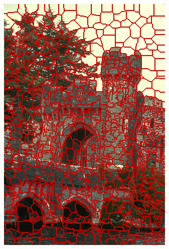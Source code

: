 \begin{figure}
{		\includegraphics[scale=\scalefivebsdtest]{pictures/bsd-test-5-cis}
	}
	\subfigure{
}
\end{figure}
